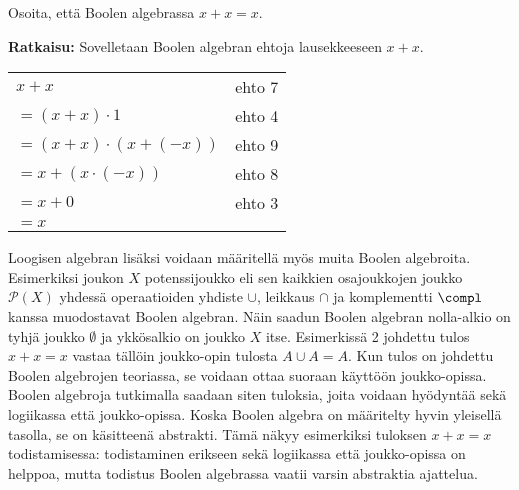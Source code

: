 \begin{esimerkki}
Osoita, että Boolen algebrassa $x + x = x$.


{\bf Ratkaisu:}
Sovelletaan Boolen algebran ehtoja lausekkeeseen $x + x$.

\begin{tabular}{ll}
$x + x$ & ehto 7 \\
$= (x + x) \cdot 1$ & ehto 4 \\
$= (x + x) \cdot (x + (-x))$ & ehto 9 \\
$= x + (x \cdot (-x))$ & ehto 8 \\
$= x + 0$ & ehto 3 \\
$= x$
\end{tabular}
\end{esimerkki}

Loogisen algebran lisäksi voidaan määritellä myös muita Boolen algebroita. Esimerkiksi joukon $X$ potenssijoukko eli sen kaikkien osajoukkojen joukko $\mathcal{P}(X)$ yhdessä operaatioiden yhdiste $\cup$, leikkaus $\cap$  ja komplementti $\compl$ kanssa muodostavat Boolen algebran. Näin saadun Boolen algebran nolla-alkio on tyhjä joukko $\emptyset$ ja ykkösalkio on joukko $X$ itse. Esimerkissä 2 johdettu tulos $x + x = x$ vastaa tällöin joukko-opin tulosta $A\cup A=A$. Kun tulos on johdettu Boolen algebrojen teoriassa, se voidaan ottaa suoraan käyttöön joukko-opissa. Boolen algebroja tutkimalla saadaan siten tuloksia, joita voidaan hyödyntää sekä logiikassa että joukko-opissa. Koska Boolen algebra on määritelty hyvin yleisellä tasolla, se on käsitteenä abstrakti. Tämä näkyy esimerkiksi tuloksen $x + x = x$ todistamisessa: todistaminen erikseen sekä logiikassa että joukko-opissa on helppoa, mutta todistus Boolen algebrassa vaatii varsin abstraktia ajattelua.



